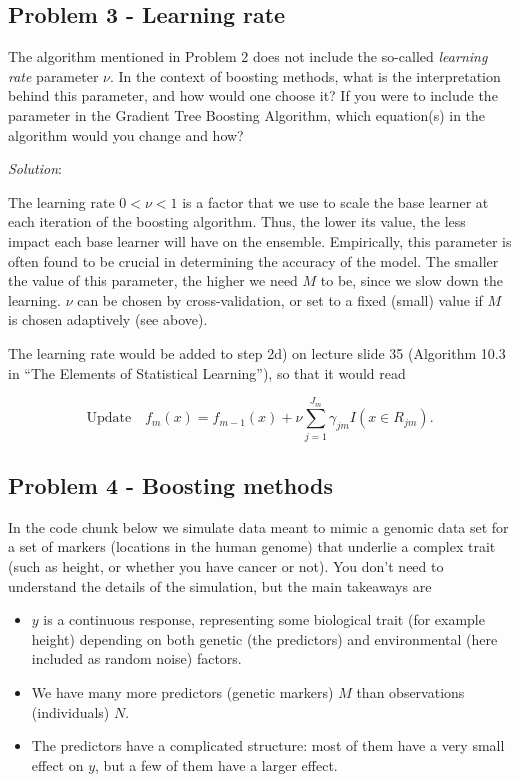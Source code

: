 \documentclass[
]{article}
\providecommand{\tightlist}{%
  \setlength{\itemsep}{0pt}\setlength{\parskip}{0pt}}
\begin{document}
\hypertarget{problem-3---learning-rate}{%
\subsection{Problem 3 - Learning rate}\label{problem-3---learning-rate}}

The algorithm mentioned in Problem 2 does not include the so-called
\emph{learning rate} parameter \(\nu\). In the context of boosting
methods, what is the interpretation behind this parameter, and how would
one choose it? If you were to include the parameter in the Gradient Tree
Boosting Algorithm, which equation(s) in the algorithm would you change
and how?

\emph{Solution}:

The learning rate \(0<\nu<1\) is a factor that we use to scale the base
learner at each iteration of the boosting algorithm. Thus, the lower its
value, the less impact each base learner will have on the ensemble.
Empirically, this parameter is often found to be crucial in determining
the accuracy of the model. The smaller the value of this parameter, the
higher we need \(M\) to be, since we slow down the learning. \(\nu\) can
be chosen by cross-validation, or set to a fixed (small) value if \(M\)
is chosen adaptively (see above).

The learning rate would be added to step 2d) on lecture slide 35
(Algorithm 10.3 in ``The Elements of Statistical Learning''), so that it
would read

\[
\text{Update} \quad f_m(x)=f_{m-1}(x) + \nu \sum_{j=1}^{J_m} \gamma_{jm}I(x\in R_{jm}).
\]

\hypertarget{problem-4---boosting-methods}{%
\subsection{Problem 4 - Boosting
methods}\label{problem-4---boosting-methods}}

In the code chunk below we simulate data meant to mimic a genomic data
set for a set of markers (locations in the human genome) that underlie a
complex trait (such as height, or whether you have cancer or not). You
don't need to understand the details of the simulation, but the main
takeaways are

\begin{itemize}
\tightlist
\item
  \(y\) is a continuous response, representing some biological trait
  (for example height) depending on both genetic (the predictors) and
  environmental (here included as random noise) factors.
\item
  We have many more predictors (genetic markers) \(M\) than observations
  (individuals) \(N\).
\item
  The predictors have a complicated structure: most of them have a very
  small effect on \(y\), but a few of them have a larger effect.
\end{itemize}
\end{document}
